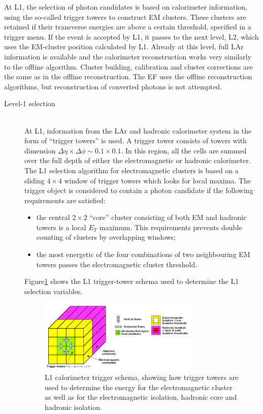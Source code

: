 \documentclass[12pt, twoside]{article}
\numberwithin{equation}{section}
\numberwithin{figure}{section}
\begin{document}
At L1, the selection of photon candidates is based on calorimeter information, using the so-called trigger towers to construct EM clusters. These clusters are retained if their transverse energies are above a certain threshold, specified in a trigger menu. If the event is accepted by L1, it passes to the next level, L2, which uses the EM-cluster position calculated by L1. Already at this level, full LAr information is available and the calorimeter reconstruction works very similarly to the offline algorithm. Cluster building, calibration and cluster corrections are the same as in the offline reconstruction. The EF uses the offline reconstruction algorithms, but reconstruction of converted photons is not attempted.
\begin{description}
    \item[Level-1 selection]    \hfil \\
    At L1, information from the LAr and hadronic calorimeter system in the form of ``trigger towers'' is used. A trigger tower consists of towers with dimension $\Delta \eta \times \Delta \phi \sim 0.1 \times 0.1$. In this region, all the cells are summed over the full depth of either the electromagnetic or hadronic calorimeter. The L1 selection algorithm for electromagnetic clusters is based on a sliding $4 \times 4$ window of trigger towers which looks for local maxima. The trigger object is considered to contain a photon candidate if the following requirements are satisfied:
    \begin{itemize}
        \item the central $2 \times 2$ ``core'' cluster consisting of both EM and hadronic towers is a local $E_{T}$ maximum. This requirements prevents double counting of clusters by overlapping windows;
        \item the most energetic of the four combinations of two neighbouring EM towers passes the electromagnetic cluster threshold.
    \end{itemize}

    Figure\;\ref{fig:ATLASTriggerTowerL1} shows the L1 trigger-tower schema used to determine the L1 selection variables.
    \begin{figure}[h]
        \centering
        \includegraphics[width=0.75\textwidth]{./images/ATLAS_TriggerTowerL1.pdf}
        \captionsetup{width=0.9\textwidth}
        \caption{L1 calorimeter trigger schema, showing how trigger towers are used to determine the energy for the electromagnetic cluster as well as for the electromagnetic isolation, hadronic core and hadronic isolation.}
        \label{fig:ATLASTriggerTowerL1}
    \end{figure}


\end{description}
\end{document}
